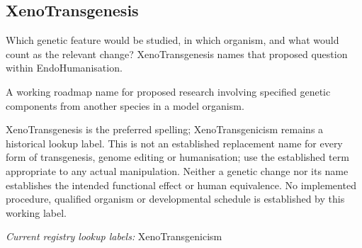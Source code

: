 \subsection*{XenoTransgenesis}
\noindent Which genetic feature would be studied, in which organism, and what would count as the relevant change? XenoTransgenesis names that proposed question within EndoHumanisation.\par
\noindent A working roadmap name for proposed research involving specified genetic components from another species in a model organism.\par
\begin{samepage}
\noindent XenoTransgenesis is the preferred spelling; XenoTransgenicism remains a historical lookup label. This is not an established replacement name for every form of transgenesis, genome editing or humanisation; use the established term appropriate to any actual manipulation. Neither a genetic change nor its name establishes the intended functional effect or human equivalence. No implemented procedure, qualified organism or developmental schedule is established by this working label.\par\nopagebreak[4]

\end{samepage}


\noindent\textit{Current registry lookup labels:} XenoTransgenicism\par

